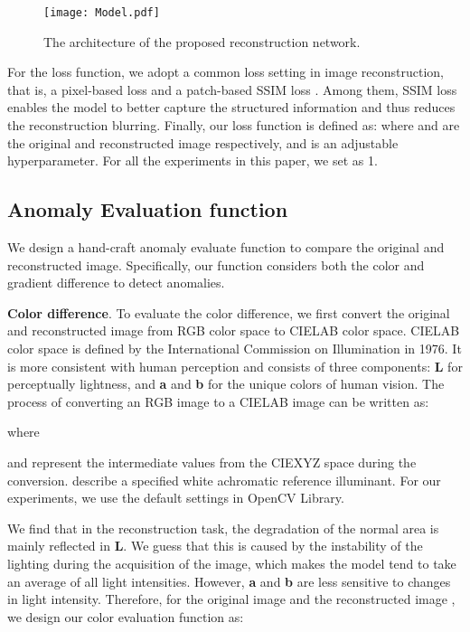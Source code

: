 \documentclass[5p, twocolumn]{elsarticle}[draft]
\begin{document}
\begin{figure}
    \centering
		\texttt{[image: Model.pdf]}
	\caption{The architecture of the proposed reconstruction network.}
	\label{FIG:3}
\end{figure}

For the loss function, we adopt a common loss setting in image reconstruction, that is, a pixel-based  loss and a patch-based SSIM loss \cite{bergmann2018improving}. Among them, SSIM loss enables the model to better capture the structured information and thus reduces the reconstruction blurring. Finally, our loss function is defined as: 
where  and  are the original and reconstructed image respectively, and  is an adjustable hyperparameter. For all the experiments in this paper, we set  as 1.

\subsection{Anomaly Evaluation function}
\label{3.3}
We design a hand-craft anomaly evaluate function to compare the original and reconstructed image. Specifically, our function considers both the color and gradient difference to detect anomalies.

\textbf{Color difference}. To evaluate the color difference, we first convert the original and reconstructed image from RGB color space to CIELAB color space. CIELAB color space is defined by the International Commission on Illumination in 1976. It is more consistent with human perception and consists of three components: \textbf{L} for perceptually lightness, and \textbf{a} and \textbf{b} for the unique colors of human vision. The process of converting an RGB image to a CIELAB image can be written as:



where

and  represent the intermediate values from the CIEXYZ space during the conversion.   describe a specified white achromatic reference illuminant. For our experiments, we use the default settings in OpenCV Library.

We find that in the reconstruction task, the degradation of the normal area is mainly reflected in \textbf{L}. We guess that this is caused by the instability of the lighting during the acquisition of the image, which makes the model tend to take an average of all light intensities. However, \textbf{a} and \textbf{b} are less sensitive to changes in light intensity. Therefore, for the original image  and the reconstructed image , we design our color evaluation function as:
\end{document}
